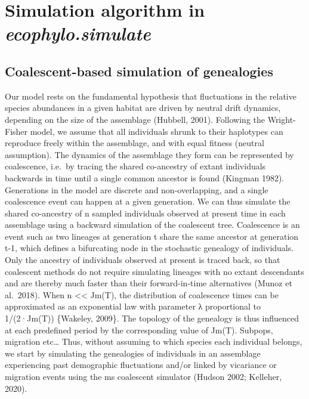 \documentclass[
]{article}
\begin{document}
\hypertarget{simulation-algorithm-in-ecophylo.simulate}{%
\section{\texorpdfstring{Simulation algorithm in
\emph{ecophylo.simulate}}{Simulation algorithm in ecophylo.simulate}}\label{simulation-algorithm-in-ecophylo.simulate}}

\hypertarget{coalescent-based-simulation-of-genealogies}{%
\subsection{Coalescent-based simulation of
genealogies}\label{coalescent-based-simulation-of-genealogies}}

Our model rests on the fundamental hypothesis that fluctuations in the
relative species abundances in a given habitat are driven by neutral
drift dynamics, depending on the size of the assemblage (Hubbell, 2001).
Following the Wright-Fisher model, we assume that all individuals shrunk
to their haplotypes can reproduce freely within the assemblage, and with
equal fitness (neutral assumption). The dynamics of the assemblage they
form can be represented by coalescence, i.e.~by tracing the shared
co-ancestry of extant individuals backwards in time until a single
common ancestor is found (Kingman 1982). Generations in the model are
discrete and non-overlapping, and a single coalescence event can happen
at a given generation. We can thus simulate the shared co-ancestry of n
sampled individuals observed at present time in each assemblage using a
backward simulation of the coalescent tree. Coalescence is an event such
as two lineages at generation t share the same ancestor at generation
t-1, which defines a bifurcating node in the stochastic genealogy of
individuals. Only the ancestry of individuals observed at present is
traced back, so that coalescent methods do not require simulating
lineages with no extant descendants and are thereby much faster than
their forward-in-time alternatives (Munoz et al.~2018). When n
\textless\textless{} Jm(T), the distribution of coalescence times can be
approximated as an exponential law with parameter λ proportional to
1/(2·Jm(T)) \{Wakeley, 2009\}. The topology of the genealogy is thus
influenced at each predefined period by the corresponding value of
Jm(T). Subpops, migration etc\ldots{} Thus, without assuming to which
species each individual belongs, we start by simulating the genealogies
of individuals in an assemblage experiencing past demographic
fluctuations and/or linked by vicariance or migration events using the
ms coalescent simulator (Hudson 2002; Kelleher, 2020).
\end{document}

